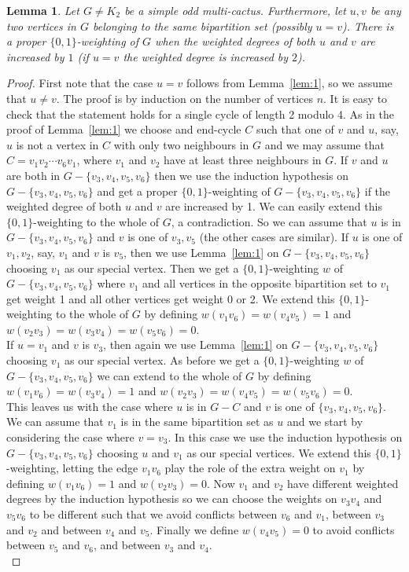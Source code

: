 \documentclass[
final,
 nomarks,
]{dmtcs-episciences}
\newtheorem{lemma}[theorem]{Lemma}
\theoremstyle{definition}
\begin{document}
\begin{lemma} \label{lem:2}
Let $G \neq K_2$ be a simple odd multi-cactus. Furthermore, let $u,v$ be any two vertices in $G$ belonging to the same bipartition set (possibly $u=v$). There is a proper $\{0,1\}$-weighting of $G$ when the weighted degrees of both $u$ and $v$ are increased by $1$ (if $u=v$ the weighted degree is increased by $2$).
\end{lemma}
\begin{proof}
First note that the case $u=v$ follows from Lemma~\ref{lem:1}, so we assume that $u \neq v$.  The proof is by induction on the number of vertices $n$. It is easy to check that the statement holds for a single cycle of length 2 modulo 4. As in the proof of Lemma~\ref{lem:1} we choose and end-cycle $C$ such that one of $v$ and $u$, say, $u$ is not a vertex in $C$ with only two neighbours in $G$ and we may assume that $C=v_1v_2 \cdots v_6v_1$, where $v_1$ and $v_2$ have at least three neighbours in $G$. If $v$ and $u$ are both in $G- \{v_3, v_4, v_5, v_6\}$ then we use the induction hypothesis on $G- \{v_3, v_4, v_5, v_6\}$ and get a proper $\{0,1\}$-weighting of $G-\{v_3, v_4, v_5, v_6\}$ if the weighted degree of both $u$ and $v$ are increased by 1. We can easily extend this $\{0,1\}$-weighting to the whole of $G$, a contradiction. So we can assume that $u$ is in $G- \{v_3, v_4, v_5, v_6\}$ and $v$ is one of $v_3,v_5$ (the other cases are similar). If $u$ is one of $v_1, v_2$, say, $v_1$ and $v$ is $v_5$, then we use Lemma~\ref{lem:1} on $G- \{v_3, v_4, v_5, v_6\}$ choosing $v_1$ as our special vertex. Then we get a $\{0,1\}$-weighting $w$ of $G- \{v_3, v_4, v_5, v_6\}$ where $v_1$ and all vertices in the opposite bipartition set to $v_1$ get weight 1 and all other vertices get weight 0 or 2. We extend this $\{0,1\}$-weighting to the whole of $G$ by defining $w(v_1v_6)=w(v_4v_5)=1$ and $w(v_2v_3)=w(v_3v_4)=w(v_5v_6)=0$. \\
If $u=v_1$ and $v$ is $v_3$, then again we use Lemma~\ref{lem:1} on $G- \{v_3, v_4, v_5, v_6\}$ choosing $v_1$ as our special vertex. As before we get a $\{0,1\}$-weighting $w$ of $G- \{v_3, v_4, v_5, v_6\}$ we can extend to the whole of $G$ by defining $w(v_1v_6)=w(v_3v_4)=1$ and $w(v_2v_3)=w(v_4v_5)=w(v_5v_6)=0$.  \\
This leaves us with the case where $u$ is in $G-C$ and $v$ is one of $\{v_3, v_4, v_5, v_6\}$. We can assume that $v_1$ is in the same bipartition set as $u$ and we start by considering the case where $v=v_3$. In this case we use the induction hypothesis on $G- \{v_3, v_4, v_5, v_6\}$ choosing $u$ and $v_1$ as our special vertices. We extend this $\{0,1\}$-weighting, letting the edge $v_1v_6$ play the role of the extra weight on $v_1$ by defining $w(v_1v_6)=1$ and $w(v_2v_3)=0$. Now $v_1$ and $v_2$ have different weighted degrees by the induction hypothesis so we can choose the weights on $v_3v_4$ and $v_5v_6$ to be different such that we avoid conflicts between $v_6$ and $v_1$, between $v_3$ and $v_2$ and between $v_4$ and $v_5$. Finally we define $w(v_4v_5)=0$ to avoid conflicts between $v_5$ and $v_6$, and between $v_3$ and $v_4$. \\

\end{proof}
\end{document}
